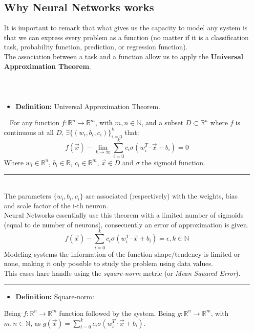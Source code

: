 \documentclass[a4paper, 11pt]{article}
\begin{document}
\subsection{Why Neural Networks works}
It is important to remark that what gives us the capacity to model any system is that we can express every problem as a function (no matter if it is a classification task, probability function, prediction, or regression function).\\
The association between a task and a function allow us to apply the \textbf{Universal Approximation Theorem}.\\
\rule{\linewidth}{0.4pt}\\
\begin{itemize}
    \item \textbf{Definition:} Universal Approximation Theorem.
\end{itemize}  
For any function $f:\mathbb{R}^n \rightarrow \mathbb{R}^m$, with $m,n\in\mathbb{N}$, and a subset $D\subset \mathbb{R}^n$ where $f$ is continuous at all $D$, 
$\exists \{(w_i, b_i, c_i)\}_{i = 0}^k$ that: 
$$f(\vec{x}) - \lim_{k \rightarrow \infty} \sum_{i=0}^{k} c_i \sigma \left( w_i^T \cdot \vec{x} + b_i \right) = 0$$
Where $w_i \in \mathbb{R}^n$, $b_i\in \mathbb{R}$, $c_i \in \mathbb{R}^m$, $\vec{x}\in D$ and $\sigma$ the sigmoid function.\\
\rule{\linewidth}{0.4pt}\\\vspace{0.5em}
The parameters $\{w_i, b_i, c_i\}$ are associated (respectively) with the weights, bias and scale factor of the i-th neuron.\\
Neural Networks essentially use this theorem with a limited number of sigmoids (equal to de number of neurons), consecuently an error of approximation is given.
$$f(\vec{x})-\sum_{i=0}^{k} c_i \sigma \left( w_i^T \cdot \vec{x} + b_i \right) = \epsilon, k \in \mathbb{N}$$
Modeling systems the information of the function shape/tendency is limited or none, making it only possible to study the problem using data values.\\
This cases hare handle using the \textit{square-norm} metric (or \textit{Mean Squared Error}).\\
\rule{\linewidth}{0.4pt}
\begin{itemize}
    \item \textbf{Definition:} Square-norm: 
\end{itemize}
Being $f:\mathbb{R}^n \rightarrow \mathbb{R}^m$ function followed by the system.
Being $g:\mathbb{R}^n \rightarrow \mathbb{R}^m$, with $m,n\in\mathbb{N}$, as $g(\vec{x}) = \sum_{i=0}^{k} c_i \sigma \left( w_i^T \cdot \vec{x} + b_i \right)$.\\
\end{document}
